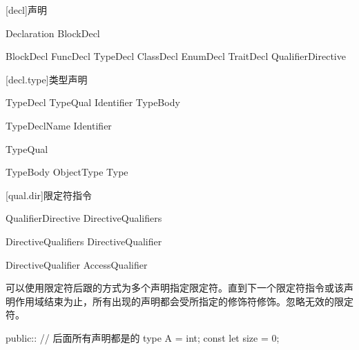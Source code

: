 
[decl]{声明}

\begin{bnf}{Declaration}
    BlockDecl
\end{bnf}

\begin{bnf}{BlockDecl}
    FuncDecl \br
    TypeDecl \br
    ClassDecl \br
    EnumDecl \br
    TraitDecl \br
    QualifierDirective
\end{bnf}

[decl.type]{类型声明}

\begin{bnf}{TypeDecl}
    TypeQual\bnfs {} Identifier TypeBody
\end{bnf}

\begin{bnf}{TypeDeclName}
    Identifier \br
\end{bnf}

\begin{bnf}{TypeQual}
\end{bnf}

\begin{bnf}{TypeBody}
    ObjectType \br
    \terminal{=} Type
\end{bnf}

[qual.dir]{限定符指令}

\begin{bnf}{QualifierDirective}
    DirectiveQualifiers \terminal{::}
\end{bnf}

\begin{bnf}{DirectiveQualifiers}
    DirectiveQualifier\bnfp
\end{bnf}

\begin{bnf}{DirectiveQualifier}
    AccessQualifier
\end{bnf}

\pnum
可以使用限定符后跟\tcode{::}的方式为多个声明指定限定符。直到下一个限定符指令或该声明作用域结束为止，所有出现的声明都会受所指定的修饰符修饰。忽略无效的限定符。

\enterexample
\begin{codeblock}
public:: // 后面所有声明都是的
type A = int;
const let size = 0;
\end{codeblock}